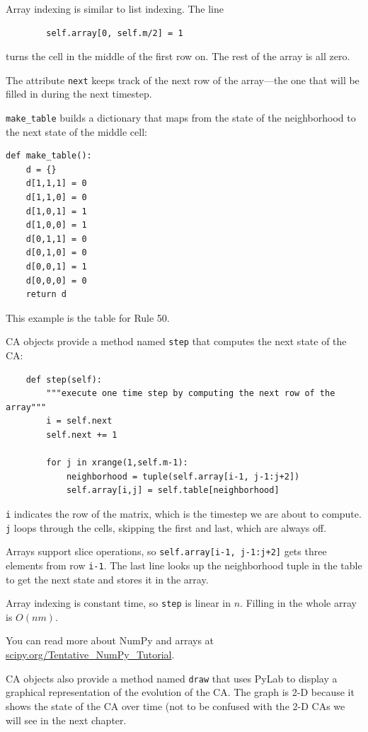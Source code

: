 \documentclass[10pt]{book}
\begin{document}
Array indexing is similar to list indexing.  The line

\begin{verbatim}
        self.array[0, self.m/2] = 1
\end{verbatim}
%
turns the cell in the middle of the first row on.  The rest
of the array is all zero.

The attribute {\tt next} keeps track of the next row of the
array---the one that will be filled in during the next timestep.

\verb"make_table" builds a dictionary that maps from the state
of the neighborhood to the next state of the middle cell:

\begin{verbatim}
def make_table():
    d = {}
    d[1,1,1] = 0
    d[1,1,0] = 0
    d[1,0,1] = 1
    d[1,0,0] = 1
    d[0,1,1] = 0
    d[0,1,0] = 0
    d[0,0,1] = 1
    d[0,0,0] = 0
    return d
\end{verbatim}

This example is the table for Rule 50.

CA objects provide a method named 
{\tt step} that computes the next state of the CA:

\begin{verbatim}
    def step(self):
        """execute one time step by computing the next row of the array"""
        i = self.next
        self.next += 1

        for j in xrange(1,self.m-1):
            neighborhood = tuple(self.array[i-1, j-1:j+2])
            self.array[i,j] = self.table[neighborhood]
\end{verbatim}

{\tt i} indicates the row of the matrix, which is the timestep
we are about to compute.  {\tt j} loops through the cells, skipping
the first and last, which are always off.

Arrays support slice operations, so {\tt self.array[i-1, j-1:j+2]}
gets three elements from row {\tt i-1}.
The last line looks up the neighborhood tuple in the table to get
the next state and stores it in the array.

Array indexing is constant time, so {\tt step} is linear in $n$.
Filling in the whole array is $O(nm)$.

You can read more about NumPy and arrays at
\url{scipy.org/Tentative_NumPy_Tutorial}.

CA objects also provide a method named {\tt draw} that uses
PyLab to display a graphical representation of the evolution
of the CA.  The graph is 2-D because it shows the state of the
CA over time (not to be confused with the 2-D CAs we will see
in the next chapter.
\end{document}
